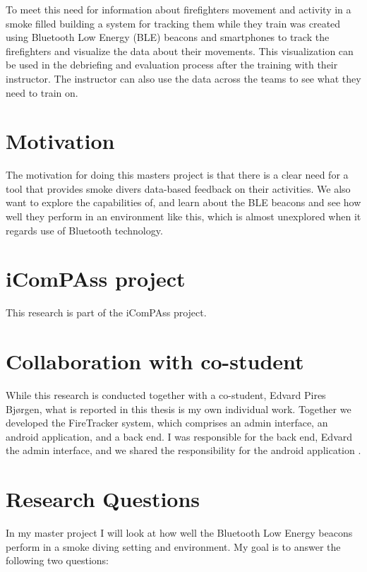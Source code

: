 \documentclass[../Main/thesis.tex]{subfiles}
\begin{document}
To meet this need for information about firefighters movement and activity in a smoke filled building a system for tracking them while they train was created using Bluetooth Low Energy (BLE) beacons and smartphones to track the firefighters and visualize the data about their movements. 
This visualization can be used in the debriefing and evaluation process after the training with their instructor.
The instructor can also use the data across the teams to see what they need to train on.

\section{Motivation}
The motivation for doing this masters project is that there is a clear need for a tool that provides smoke divers data-based feedback on their activities.
We also want to explore the capabilities of, and learn about the BLE beacons and see how well they perform in an environment like this, which is almost unexplored when it regards use of Bluetooth technology. 

\section{iComPAss project}
This research is part of the iComPAss project. \citep{Netteland2016}

\section{Collaboration with co-student}
While this research is conducted together with a co-student, Edvard Pires Bjørgen, what is reported in this thesis is my own individual work.
Together we developed the FireTracker system, which comprises an admin interface, an android application, and a back end.
I was responsible for the back end, Edvard the admin interface, and we shared the responsibility for the android application \citep{Bjorgen2018}. 

\section{Research Questions}
\label{ch:reserch_questions}
In my master project I will look at how well the Bluetooth Low Energy beacons perform in a smoke diving setting and environment. 
My goal is to answer the following two questions:
\end{document}
